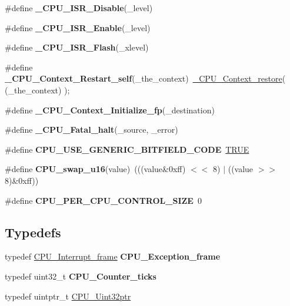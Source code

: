 \begin{DoxyCompactItemize}
\item 
\#define {\bfseries \+\_\+\+C\+P\+U\+\_\+\+I\+S\+R\+\_\+\+Disable}(\+\_\+level)
\item 
\#define {\bfseries \+\_\+\+C\+P\+U\+\_\+\+I\+S\+R\+\_\+\+Enable}(\+\_\+level)
\item 
\#define {\bfseries \+\_\+\+C\+P\+U\+\_\+\+I\+S\+R\+\_\+\+Flash}(\+\_\+xlevel)
\item 
\mbox{\label{group__RTEMSScoreCPUMIPS_ga3fb67e174d7b61251322cd32126acd1a}} 
\#define {\bfseries \+\_\+\+C\+P\+U\+\_\+\+Context\+\_\+\+Restart\+\_\+self}(\+\_\+the\+\_\+context)~\mbox{\hyperlink{group__RTEMSScoreCPUARM_ga80726ebfe00f31a88b086cc4474c472f}{\+\_\+\+C\+P\+U\+\_\+\+Context\+\_\+restore}}( (\+\_\+the\+\_\+context) );
\item 
\#define {\bfseries \+\_\+\+C\+P\+U\+\_\+\+Context\+\_\+\+Initialize\+\_\+fp}(\+\_\+destination)
\item 
\#define {\bfseries \+\_\+\+C\+P\+U\+\_\+\+Fatal\+\_\+halt}(\+\_\+source,  \+\_\+error)
\item 
\mbox{\label{group__RTEMSScoreCPUMIPS_gab0aff7a561b9c030a4d88eff201f4688}} 
\#define {\bfseries C\+P\+U\+\_\+\+U\+S\+E\+\_\+\+G\+E\+N\+E\+R\+I\+C\+\_\+\+B\+I\+T\+F\+I\+E\+L\+D\+\_\+\+C\+O\+DE}~\mbox{\hyperlink{group__RTEMSScoreBaseDefs_gaa8cecfc5c5c054d2875c03e77b7be15d}{T\+R\+UE}}
\item 
\mbox{\label{group__RTEMSScoreCPUMIPS_ga1936ecb0107e5875a7b538374c1f621d}} 
\#define {\bfseries C\+P\+U\+\_\+swap\+\_\+u16}(value)~(((value\&0xff) $<$$<$ 8) $\vert$ ((value $>$$>$ 8)\&0xff))
\item 
\mbox{\label{group__RTEMSScoreCPUMIPS_gaf8e38596ad3db49995fd8eb9fb4e86b2}} 
\#define {\bfseries C\+P\+U\+\_\+\+P\+E\+R\+\_\+\+C\+P\+U\+\_\+\+C\+O\+N\+T\+R\+O\+L\+\_\+\+S\+I\+ZE}~0
\end{DoxyCompactItemize}
\subsection*{Typedefs}
\begin{DoxyCompactItemize}
\item 
\mbox{\label{group__RTEMSScoreCPUMIPS_ga09f1943559c701e24e5057e9aaea0d13}} 
typedef \mbox{\hyperlink{structCPU__Interrupt__frame}{C\+P\+U\+\_\+\+Interrupt\+\_\+frame}} {\bfseries C\+P\+U\+\_\+\+Exception\+\_\+frame}
\item 
\mbox{\label{group__RTEMSScoreCPUMIPS_ga67f8550aad58bccb6fcb4589894444ad}} 
typedef uint32\+\_\+t {\bfseries C\+P\+U\+\_\+\+Counter\+\_\+ticks}
\item 
typedef uintptr\+\_\+t \mbox{\hyperlink{group__RTEMSScoreCPUMIPS_ga9fca17f81f850e128fcc8ed5b87ff2ab}{C\+P\+U\+\_\+\+Uint32ptr}}
\end{DoxyCompactItemize}
